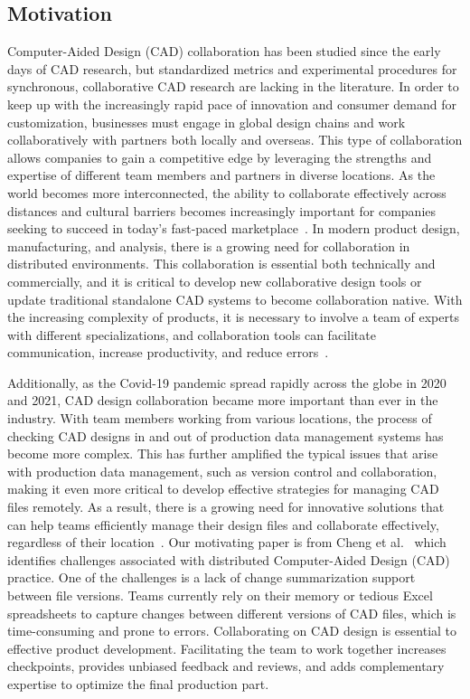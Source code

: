 \documentclass[sigconf,authorversion,nonacm]{acmart}
\begin{document}
\subsection{Motivation}
Computer-Aided Design (CAD) collaboration has been studied since the early days of CAD research, but standardized metrics and experimental procedures for synchronous, collaborative CAD research are lacking in the literature. In order to keep up with the increasingly rapid pace of innovation and consumer demand for customization, businesses must engage in global design chains and work collaboratively with partners both locally and overseas.
This type of collaboration allows companies to gain a competitive edge by leveraging the strengths and expertise of different team members and partners in diverse locations.
As the world becomes more interconnected, the ability to collaborate effectively across distances and cultural barriers becomes increasingly important for companies seeking to succeed in today's fast-paced marketplace~\cite{fuh2005advances}.
In modern product design, manufacturing, and analysis, there is a growing need for collaboration in distributed environments. This collaboration is essential both technically and commercially, and it is critical to develop new collaborative design tools or update traditional standalone CAD systems to become collaboration native.
With the increasing complexity of products, it is necessary to involve a team of experts with different specializations, and collaboration tools can facilitate communication, increase productivity, and reduce errors~\cite{fuh2005advances}.

Additionally, as the Covid-19 pandemic spread rapidly across the globe in 2020 and 2021, CAD design collaboration became more important than ever in the industry.
With team members working from various locations, the process of checking CAD designs in and out of production data management systems has become more complex.
This has further amplified the typical issues that arise with production data management, such as version control and collaboration, making it even more critical to develop effective strategies for managing CAD files remotely.
As a result, there is a growing need for innovative solutions that can help teams efficiently manage their design files and collaborate effectively, regardless of their location~\cite{armstrong}.
Our motivating paper is from Cheng et al.~\cite{cheng2023age} which identifies challenges associated with distributed Computer-Aided Design (CAD) practice. One of the challenges is a lack of change summarization support between file versions.
Teams currently rely on their memory or tedious Excel spreadsheets to capture changes between different versions of CAD files, which is time-consuming and prone to errors. Collaborating on CAD design is essential to effective product development.
Facilitating the team to work together increases checkpoints, provides unbiased feedback and reviews, and adds complementary expertise to optimize the final production part.
\end{document}

